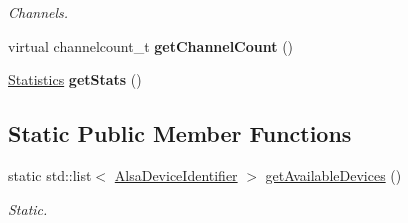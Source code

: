 \begin{DoxyCompactItemize}
\begin{DoxyCompactList}\small\item\em Channels. \end{DoxyCompactList}\item 
\hypertarget{classNl_1_1AudioAlsa_aad8e4064dc35ecba3e0ce74a7d10e8a8}{}virtual channelcount\+\_\+t {\bfseries get\+Channel\+Count} ()\label{classNl_1_1AudioAlsa_aad8e4064dc35ecba3e0ce74a7d10e8a8}

\item 
\hypertarget{classNl_1_1AudioAlsa_a9da16275704c5646db14b94dd02ca3e6}{}\hyperlink{structNl_1_1Statistics}{Statistics} {\bfseries get\+Stats} ()\label{classNl_1_1AudioAlsa_a9da16275704c5646db14b94dd02ca3e6}

\end{DoxyCompactItemize}
\subsection*{Static Public Member Functions}
\begin{DoxyCompactItemize}
\item 
\hypertarget{classNl_1_1AudioAlsa_a6c1969f1f344b8a13c27e26e02279c54}{}static std\+::list$<$ \hyperlink{classNl_1_1AlsaDeviceIdentifier}{Alsa\+Device\+Identifier} $>$ \hyperlink{classNl_1_1AudioAlsa_a6c1969f1f344b8a13c27e26e02279c54}{get\+Available\+Devices} ()\label{classNl_1_1AudioAlsa_a6c1969f1f344b8a13c27e26e02279c54}

\begin{DoxyCompactList}\small\item\em Static. \end{DoxyCompactList}\end{DoxyCompactItemize}
